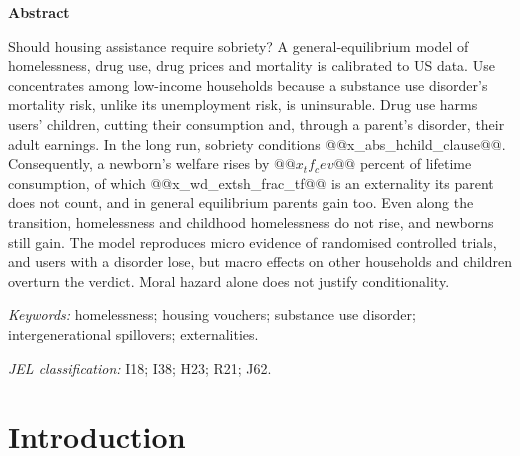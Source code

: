 \documentclass[10pt]{article}
\makeatletter
\newif\ifshowupdates \showupdatesfalse
\newcommand{\listofupdates}{\ifshowupdates\par\noindent{\color{blue}\textbf{Pending updates from the new simulations}}\par
  {\small\@starttoc{upd}}\fi}
\newcommand{\listofwhys}{\ifshowupdates\par\noindent{\color{whygreen}\textbf{Notes on this round's changes}}\par
  {\small\@starttoc{why}}\fi}
\makeatother
\begin{document}
\vspace{0.4em}
\begin{center}
\begin{minipage}{0.86\textwidth}
\begin{center}\textbf{Abstract}\end{center}
\noindent Should housing assistance require sobriety? A general-equilibrium model of homelessness, drug use, drug prices and mortality is calibrated to US data. Use concentrates among low-income households because a substance use disorder's mortality risk, unlike its unemployment risk, is uninsurable. Drug use harms users' children, cutting their consumption and, through a parent's disorder, their adult earnings. In the long run, sobriety conditions @@x_abs_hchild_clause@@. Consequently, a newborn's welfare rises by $@@x_tf_cev@@$ percent of lifetime consumption, of which @@x_wd_extsh_frac_tf@@ is an externality its parent does not count, and in general equilibrium parents gain too. Even along the transition, homelessness and childhood homelessness do not rise, and newborns still gain. The model reproduces micro evidence of randomised controlled trials, and users with a disorder lose, but macro effects on other households and children overturn the verdict. Moral hazard alone does not justify conditionality.

\vspace{0.6em}
\noindent\textit{Keywords:} homelessness; housing vouchers; substance
use disorder; intergenerational spillovers; externalities.

\vspace{0.2em}
\noindent\textit{JEL classification:} I18; I38; H23; R21; J62.
\end{minipage}
\end{center}

\vspace{0.8em}


\listofupdates

\listofwhys

\section{Introduction}\label{sec:intro}
\end{document}
